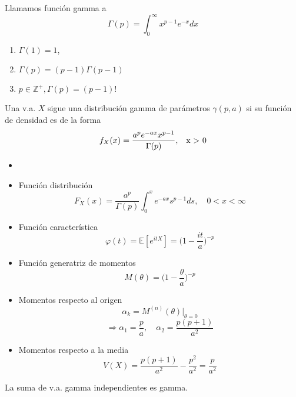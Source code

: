 \begin{defn}
  Llamamos función gamma a
  \[ 
    \Gamma(p) = \int_{0}^{\infty} x^{p-1} e^{-x} dx 
  \] 
\end{defn}

\begin{prop}
  \begin{enumerate}[label=(\roman*)]
    \item $\Gamma(1) = 1$,
    \item $\Gamma(p) = (p - 1) \Gamma(p - 1)$
    \item $p \in \mathbb{Z}^{+}, \Gamma(p) = (p - 1)!$
  \end{enumerate}
\end{prop}

\begin{defn}
  Una v.a. $X$ sigue una distribución gamma de parámetros $\gamma(p, a)$ si su función de densidad es de la forma 
  \[ 
    f_{X}(x) = \frac{a^{p} e^{-ax} x^{p-1}}{\Gamma(p)}, \quad $x > 0$
  \] 
\end{defn}

\begin{prop}
  \begin{itemize}
    \item []
    \item Función distribución
      \[ 
        F_{X}(x) = \frac{a^{p}}{\Gamma(p)} \int_{0}^{x} e^{-ax} s^{p-1} ds, \quad 0 < x < \infty 
      \] 
    \item Función característica
      \[ 
        \varphi(t) = \mathbb{E} [ e^{itX} ]  = \Big ( 1 - \frac{it}{a} \Big )^{-p}
      \] 
    \item Función generatriz de momentos
      \[ 
        M(\theta) = \Big ( 1 - \frac{\theta}{a} \Big )^{-p} 
      \] 
    \item Momentos respecto al origen
      \[ 
        \alpha_{k} = M^{(n)}(\theta) \Big|_{\theta = 0} 
      \] 
      \[ 
        \Rightarrow \alpha_{1} = \frac{p}{a}, \quad \alpha_{2} = \frac{p(p+1)}{a^{2}}
      \] 
    \item Momentos respecto a la media
      \[ 
        V(X) = \frac{p(p + 1)}{a^{2}} - \frac{p ^{2}}{a^{2}} = \frac{p}{a^{2}} 
      \] 
  \end{itemize}
\end{prop}

\begin{theo}
  La suma de v.a. gamma independientes es gamma.
\end{theo}

